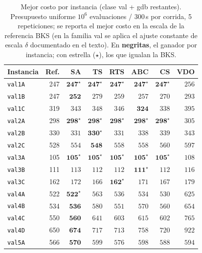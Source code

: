 \begin{table}[htbp]
\centering
\caption{Mejor costo por instancia (clase val + gdb restantes). Presupuesto uniforme $10^6$ evaluaciones / 300\,s por corrida, 5 repeticiones; se reporta el mejor costo en la escala de la referencia BKS (en la familia val se aplica el ajuste constante de escala $\delta$ documentado en el texto). En \textbf{negritas}, el ganador por instancia; con estrella ($\star$), los que igualan la BKS.}
\label{tab:mejores-val-gdb}
\small
\begin{tabular}{lrrrrrrr}
\toprule
Instancia & Ref. & SA & TS & RTS & ABC & CS & VDO \\
\midrule
\texttt{val1A} & 247 & $\mathbf{247}^{\star}$ & $\mathbf{247}^{\star}$ & $\mathbf{247}^{\star}$ & $\mathbf{247}^{\star}$ & $\mathbf{247}^{\star}$ & $256$ \\
\texttt{val1B} & 247 & $\mathbf{252}$ & $279$ & $259$ & $257$ & $270$ & $293$ \\
\texttt{val1C} & 319 & $343$ & $348$ & $346$ & $\mathbf{324}$ & $338$ & $395$ \\
\texttt{val2A} & 298 & $\mathbf{298}^{\star}$ & $\mathbf{298}^{\star}$ & $\mathbf{298}^{\star}$ & $\mathbf{298}^{\star}$ & $\mathbf{298}^{\star}$ & $305$ \\
\texttt{val2B} & 330 & $331$ & $\mathbf{330}^{\star}$ & $331$ & $338$ & $339$ & $343$ \\
\texttt{val2C} & 528 & $554$ & $\mathbf{548}$ & $558$ & $558$ & $560$ & $597$ \\
\texttt{val3A} & 105 & $\mathbf{105}^{\star}$ & $\mathbf{105}^{\star}$ & $\mathbf{105}^{\star}$ & $\mathbf{105}^{\star}$ & $\mathbf{105}^{\star}$ & $108$ \\
\texttt{val3B} & 111 & $113$ & $112$ & $112$ & $\mathbf{111}^{\star}$ & $112$ & $116$ \\
\texttt{val3C} & 162 & $172$ & $166$ & $\mathbf{162}^{\star}$ & $171$ & $167$ & $179$ \\
\texttt{val4A} & 522 & $\mathbf{522}^{\star}$ & $563$ & $536$ & $534$ & $530$ & $625$ \\
\texttt{val4B} & 534 & $\mathbf{536}$ & $580$ & $551$ & $570$ & $560$ & $654$ \\
\texttt{val4C} & 550 & $\mathbf{560}$ & $641$ & $603$ & $615$ & $602$ & $765$ \\
\texttt{val4D} & 650 & $\mathbf{674}$ & $717$ & $713$ & $758$ & $720$ & $922$ \\
\texttt{val5A} & 566 & $\mathbf{570}$ & $599$ & $576$ & $598$ & $588$ & $594$ \\

\end{tabular}
\end{table}
